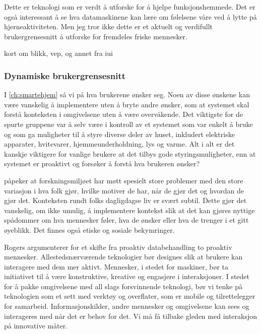 Dette er teknologi som er verdt å utforske for å hjelpe funksjonshemmede. Det er også interessant å se hva datamaskinene kan lære om følelsene våre ved å lytte på hjerneaktiviteten. Men jeg tror ikke dette er et aktuelt og verdifullt brukergrensesnitt å utforske for fremdeles friske mennesker.

{\color{red}kort om blikk, vep, og annet fra iui}

\subsubsection*{Dynamiske brukergrensesnitt}
I \ref{ch:smartehjem} så vi på hva brukerene ønsker seg. Noen av disse ønskene kan være vanskelig å implementere uten å bryte andre ønsker, som at systemet skal forstå konteksten i omgivelsene uten å være overvåkende. Det viktigste for de spurte gruppene var å selv være i kontroll av et systemet som var enkelt å bruke og som ga muligheter til å styre diverse deler av huset, inkludert elektriske apparater, hvitevarer, hjemmeunderholdning, lys og varme. Alt i alt er det kanskje viktigere for vanlige brukere at det tilbys gode styringsmuligheter, enn at systemet er proaktivt og forsøker å forstå hva brukeren ønsker?

\citet{rogers06} påpeker at forskningsmiljøet har møtt spesielt store problemer med den store variasjon i hva folk gjør, hvilke motiver de har, når de gjør det og hvordan de gjør det. Konteksten rundt folks dagligdagse liv er svært subtil. Dette gjør det vanskelig, om ikke umulig, å implementere kontekst slik at det kan gjøres nyttige spådommer om hva mennesker føler, hva de ønsker eller hva de trenger i et gitt øyeblikk. Det finnes også etiske og sosiale bekymringer.

Rogers argumenterer for et skifte fra proaktiv databehandling to proaktiv mennesker. Allestedsnærværende teknologier bør designes slik at brukere kan interagere med dem mer aktivt. Mennesker, i stedet for maskiner, bør ta initiativet til å være konstruktive, kreative og engasjere i interaksjoner. I stedet for å pakke omgivelsene med all slags forsvinnende teknologi, bør vi tenke på teknologien som et sett med verktøy og overflater, som er mobile og tilrettelegger for samarbeid. Informasjonskilder, andre mennesker og omgivelsene kan sees og interageres med når det er behov for det. Vi må få tilbake gleden med interaksjon på innovative måter.

